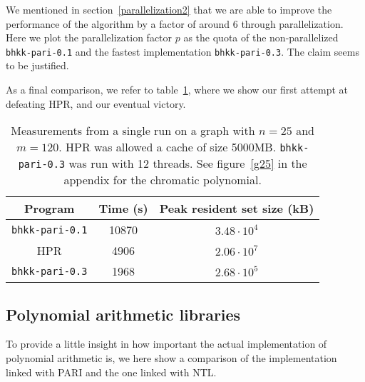 \documentclass{cslthse-msc}
\newcommand{\code}{\texttt}
\begin{document}
We mentioned in section~\ref{parallelization2} that we are able to improve the performance of the algorithm by a factor of around 6 through parallelization. Here we plot the parallelization factor $p$ as the quota of the non-parallelized \code{bhkk-pari-0.1} and the fastest implementation \code{bhkk-pari-0.3}. The claim seems to be justified.



As a final comparison, we refer to table~\ref{improvements}, where we show our first attempt at defeating HPR, and our eventual victory.

\begin{table}[t]\centering
\begin{tabular}{c|cc} \hline
  Program & Time (s) & Peak resident set size (kB) \\ \hline
  \code{bhkk-pari-0.1} & 10870 & $3.48 \cdot 10^{4}$ \\ \hline
  HPR & 4906 & $2.06 \cdot 10^{7}$ \\ \hline
  \code{bhkk-pari-0.3} & 1968 & $2.68 \cdot 10^{5}$ \\ \hline
\end{tabular}
\caption{Measurements from a single run on a graph with $n = 25$ and $m = 120$. HPR was allowed a cache of size 5000MB. \code{bhkk-pari-0.3} was run with 12 threads. See figure~\ref{g25} in the appendix for the chromatic polynomial.}
\label{improvements}
\end{table}

\subsection{Polynomial arithmetic libraries}
To provide a little insight in how important the actual implementation of polynomial arithmetic is, we here show a comparison of the implementation linked with PARI and the one linked with NTL.
\end{document}
